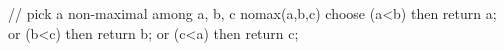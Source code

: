 // pick a non-maximal among {a, b, c}
nomax(a,b,c) {
    choose (a<b) then return a;
        or (b<c) then return b;
        or (c<a) then return c;
}
